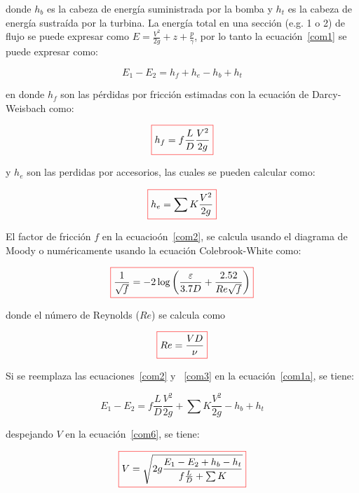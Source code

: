 \documentclass[11pt, oneside]{article}
\begin{document}
donde $h_b$ es la cabeza de energ\'ia suministrada por la bomba y $h_t$ es la cabeza de energ\'ia sustra\'ida por la turbina. La energ\'ia total en una secci\'on (e.g. 1 o 2) de flujo se puede expresar como $E = \frac{{V}^2}{2g}+ z + \frac{p}{\gamma}$, por lo tanto la ecuaci\'on~\ref{com1} se puede expresar como:

\begin{equation}
E_1 - E_2 = h_f + h_e - h_b + h_t
\label{com1a}
\end{equation}

en donde $h_f$ son las p\'erdidas por fricci\'on   estimadas con la ecuaci\'on de Darcy-Weisbach como:

\begin{equation}
\color{red}\boxed{\color{black} h_f = f \frac{L}{D}\frac{V^2}{2g} }
\label{com2}
\end{equation}

y $h_e$ son las perdidas por accesorios, las cuales se pueden calcular como:

\begin{equation}
\color{red}\boxed{\color{black} h_e = \sum K \frac{V^2}{2g} }
\label{com3}
\end{equation}

El factor de fricci\'on $f$ en la ecuacio\'on~\ref{com2}, se calcula usando el diagrama de Moody o num\'ericamente usando la ecuaci\'on Colebrook-White como:
 
\begin{equation}
\color{red}\boxed{\color{black}  \frac{1}{\sqrt{f}}= -2 \log \left( \frac{\varepsilon}{3.7D} + \frac{2.52}{Re \sqrt{f}} \right) }
\label{com4}
\end{equation}

donde el n\'umero de Reynolds ($Re$) se calcula como

\begin{equation}
\color{red}\boxed{\color{black} Re = \frac{VD}{\nu} } 
\label{com5}
\end{equation}

Si se reemplaza las ecuaciones~\ref{com2} y ~\ref{com3} en la ecuaci\'on~\ref{com1a}, se tiene:

\begin{equation}
E_1 - E_2 =  f \frac{L}{D}\frac{V^2}{2g} + \sum K \frac{V^2}{2g} - h_b + h_t
\label{com6}
\end{equation}

despejando $V$ en la ecuaci\'on~\ref{com6}, se tiene:
 
\begin{equation}
\color{red}\boxed{\color{black} V = \sqrt{2g\frac{E_1 - E_2 + h_b - h_t}{f\frac{L}{D} + \sum K } } }
\label{com7}
\end{equation}
\end{document}
